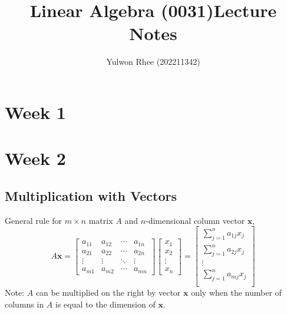 



\title{Linear Algebra (0031)\newline\space Lecture Notes}
\author{Yulwon Rhee (202211342)}

\maketitle

\section{Week 1}

\section{Week 2}
\subsection{Multiplication with Vectors}
General rule for $m\times n$ matrix $A$ and $n$-dimensional column vector $\mathbf{x}$,
$$A\mathbf{x} = \begin{bmatrix}
    a_{11}&a_{12}&\cdots&a_{1n}\\
    a_{21}&a_{22}&\cdots&a_{2n}\\
    \vdots&\vdots&\ddots&\vdots\\
    a_{m1}&a_{m2}&\cdots&a_{mn}
\end{bmatrix}\begin{bmatrix}
    x_1\\x_2\\\vdots\\x_n
\end{bmatrix}=\begin{bmatrix}
    \sum^n_{j=1} a_{1j}x_j\\
    \sum^n_{j=1} a_{2j}x_j\\
    \vdots\\
    \sum^n_{j=1} a_{mj}x_j\\
\end{bmatrix}$$
Note: $A$ can be multiplied on the right by vector $\mathbf{x}$ only when the number of columns in $A$ is equal to the dimension of $\mathbf{x}$.

